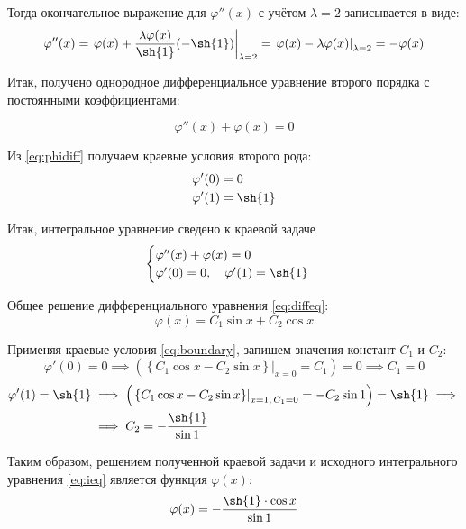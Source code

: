 \documentclass{article}
\numberwithin{equation}{section}
\renewcommand{\phi}{\varphi}
\providecommand{\at}[2]{\left. {#1}\right\vert_{#2}}
\begin{document}
Тогда окончательное выражение для $\phi''(x)$ с учётом $\lambda = 2$
записывается в виде:
\begin{equation}
  \label{eq:phi2diff}
  \phi''(x) = \at{\phi(x) + \frac{\lambda \phi(x)}{\sh{1}}(-\sh{1})}{\lambda=2} =
  \at{\phi(x) - \lambda \phi(x)}{\lambda=2} = -\phi(x)
\end{equation}

Итак, получено однородное дифференциальное уравнение второго порядка с
постоянными коэффициентами:

\begin{equation}
  \label{eq:diffeq}
  \phi''(x) + \phi(x) = 0
\end{equation}

Из \eqref{eq:phidiff} получаем краевые условия второго рода:
\begin{subequations}
  \label{eq:boundary}
  \begin{align}
    \phi'(0) &= 0 \\
    \phi'(1) &= \sh{1}
  \end{align}
\end{subequations}

Итак, интегральное уравнение сведено к краевой задаче
\begin{equation}
  \begin{cases}
    \phi''(x) + \phi(x) = 0\\
    \phi'(0) = 0, \quad \phi'(1) = \sh{1}
  \end{cases}
\end{equation}

Общее решение дифференциального уравнения \eqref{eq:diffeq}:
\begin{equation}
  \phi(x) = C_1 \sin{x} + C_2 \cos{x}
\end{equation}

Применяя краевые условия \eqref{eq:boundary}, запишем значения
констант $C_1$ и $C_2$:
\begin{equation*}
  \phi'(0) = 0 \implies
  \left( \at{\left \{ C_1 \cos{x} - C_2 \sin{x} \right \}}{x=0} =
    C_1 \right) = 0 \implies C_1 = 0
\end{equation*}
\begin{align*}
  \phi'(1) = \sh{1} &\implies
  \left( \at{\left \{ C_1 \cos{x} - C_2 \sin{x} \right
      \}}{x=1,\, C_1=0} = - C_2 \sin{1} \right) = \sh{1} \implies\\
  &\implies C_2 = -\frac{\sh{1}}{\sin{1}}
\end{align*}

Таким образом, решением полученной краевой задачи и исходного
интегрального уравнения \eqref{eq:ieq} является функция $\phi(x)$:
\begin{equation}
  \label{eq:anal-solution}
  \phi(x) = -\frac{\sh{1} \cdot \cos{x}}{\sin{1}}
\end{equation}
\end{document}
